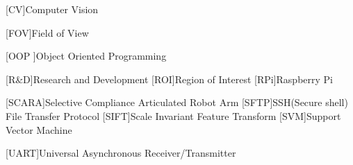 \begin{acronym}
	[CV]{Computer Vision}
	
	[FOV]{Field of View}
	
	[OOP ]{Object Oriented Programming }
	
	[R\&D]{Research and Development}
	[ROI]{Region of Interest}
	[RPi]{Raspberry Pi}
			
	[SCARA]{Selective Compliance Articulated Robot Arm}
	[SFTP]{SSH(Secure shell) File Transfer Protocol}
	[SIFT]{Scale Invariant Feature Transform}
	[SVM]{Support Vector Machine}
	
	[UART]{Universal Asynchronous Receiver/Transmitter}
\end{acronym}

